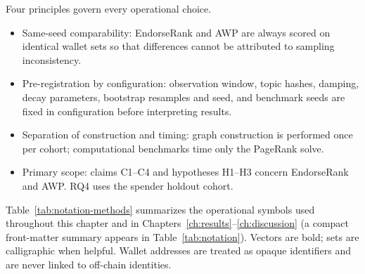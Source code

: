 Four principles govern every operational choice.
\begin{itemize}
\item Same-seed comparability: EndorseRank and AWP are always scored on identical wallet sets so that differences cannot be attributed to sampling inconsistency.
\item Pre-registration by configuration: observation window, topic hashes, damping, decay parameters, bootstrap resamples and seed, and benchmark seeds are fixed in configuration before interpreting results.
\item Separation of construction and timing: graph construction is performed once per cohort; computational benchmarks time only the PageRank solve.
\item Primary scope: claims C1--C4 and hypotheses H1--H3 concern EndorseRank and AWP. RQ4 uses the spender holdout cohort.
\end{itemize}


Table~\ref{tab:notation-methods} summarizes the operational symbols used throughout this chapter and in Chapters~\ref{ch:results}--\ref{ch:discussion} (a compact front-matter summary appears in Table~\ref{tab:notation}). Vectors are bold; sets are calligraphic when helpful. Wallet addresses are treated as opaque identifiers and are never linked to off-chain identities.

